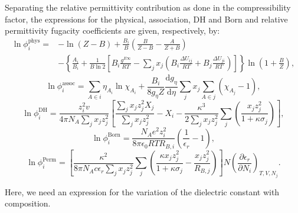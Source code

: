 Separating the relative permittivity contribution as done in the compressibility factor, the expressions for the physical, association, DH and Born and relative permittivity fugacity coefficients are given, respectively, by:
\begin{equation}
\begin{aligned}
\ln{\phi_i^{\text{phys}}} = &  -\ln{\left ( Z-B \right )}+\frac{B_i}{B}\left ( \frac{B}{Z-B}-\frac{A}{Z+B} \right ) \  \\
      &   -\left \{ \frac{A_i}{B_i}+\frac{1}{B\ln{2}}\left [ B_i\frac{g^{E\infty}}{RT} - \sum_jx_j\left ( B_i\frac{\Delta U_{ij}}{RT} + B_j\frac{\Delta U_{ji}}{RT} \right ) \right ] \right \}\ln{\left (1+\frac{B}{Z}  \right )},
      \label{Eq:eCPA_phi_phys}
\end{aligned}
\end{equation}
\begin{equation}
    \ln{\phi_i^{\text{assoc}}}  = \sum_{A \in i} \eta_{A_i}\ln\chi_{A_i}+\frac{B_i}{8g_{\eta}Z}\frac{\mathrm{d} g_\eta}{\mathrm{d} \eta} \sum_j x_j  \sum_{A \in j}\left (\chi_{A_j}-1\right ),
    \label{Eq:CPA_phi_assoc}
\end{equation}
\begin{equation}
    \ln{\phi_i^{\text{DH}}} = \frac{z_i^2v}{4\pi N_A  \sum_j x_j z_j^2} \left [  \frac{\sum_j x_j z_j^2 X_j}{\sum_j x_j z_j^2} - X_i - \frac{\kappa^3}{2 \sum_j x_j z_j^2} \sum_j \left (  \frac{x_jz_j^2}{1+\kappa\sigma_j}\right ) \right ],
    \label{Eq:Phi_DH}
\end{equation}
\begin{equation}
    \ln{\phi_i^{\text{Born}}}  =   \frac{N_A e^2 z_i^2}{8\pi \epsilon_0RT R_{B,i} } \left ( \frac{1}{\epsilon_r} - 1\right ),
    \label{Eq:Phi_Born}
\end{equation}
\begin{equation}
        \ln{\phi_i^{\text{Perm}}} =  \left [ \frac{\kappa^2}{8\pi N_A c \epsilon_r \sum_j x_j z_j^2}\sum_j \left (  \frac{\kappa x_j z_j^2}{1+\kappa \sigma_j} - \frac{ x_j z_j^2}{R_{B,j}} \right )  \right ] N \left  (  \frac{\partial \epsilon_r}{\partial N_i} \right )_{T, V, N_j}.
        \label{Eq:PhiPerm}
\end{equation} 

Here, we need an expression for the variation of the dielectric constant with composition.

